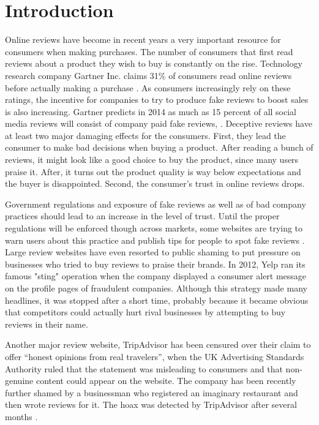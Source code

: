 \chapter{Introduction}\label{chapter:introduction}

Online reviews have become in recent years a very important resource for consumers when making purchases. The number of consumers that first read reviews about a product they wish to buy is constantly on the rise. Technology research company Gartner Inc. claims 31\% of consumers read online reviews before actually making a purchase \citet{Gartner2013}. As consumers increasingly rely on these ratings, the incentive for companies to try to produce fake reviews to boost sales is also increasing. Gartner predicts in 2014 as much as 15 percent of all social media reviews will consist of company paid fake reviews, \citet{Gartner2012}. Deceptive reviews have at least two major damaging effects for the consumers. First, they lead the consumer to make bad decisions when buying a product. After reading a bunch of reviews, it might look like a good choice to buy the product, since many users praise it. After, it turns out the product quality is way below expectations and the buyer is disappointed. Second, the consumer's trust in online reviews drops. 

Government regulations and exposure of fake reviews as well as of bad company practices should lead to an increase in the level of trust. Until the proper regulations will be enforced though across markets, some websites are trying to warn users about this practice and publish tips for people to spot fake reviews \citet{TheGuardian2013,Consumerist2010}. Large review websites have even resorted to public shaming to put pressure on businesses who tried to buy reviews to praise their brands. In 2012, Yelp ran its famous "sting" operation when the company displayed a consumer alert message on the profile pages of fraudulent companies. Although this strategy made many headlines, it was stopped after a short time, probably because it became obvious that competitors could actually hurt rival businesses by attempting to buy reviews in their name. 

Another major review website, TripAdvisor has been censured over their claim to offer “honest opinions from real travelers”, when the UK Advertising Standards Authority ruled that the statement was misleading to consumers and that non-genuine content could appear on the website. The company has been recently further shamed by a businessman who registered an imaginary restaurant and then wrote reviews for it. The hoax was detected by TripAdvisor after several months \citet{Forbes2013}.


